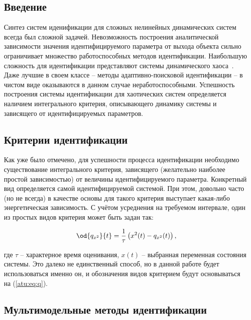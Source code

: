 \documentclass[a4paper,paratype,12pt,fouriernc]{cmonogra}
\title{\bookname}
\author{Коллективный автор}
\begin{document}
\tableofcontents



\subsection*{Введение}

Синтез систем иденификации для сложных нелинейных динамических систем
всегда был сложной задачей. Невозможность построения
аналитической зависимости значения идентифицируемого параметра
от выхода объекта сильно ограничивает множество работоспособных
методов идентификации. Наибольшую сложность для идентификации
представляют системы динамического хаоса~\cite{moon_chaotic_vibr,anisch_nonlin_eff,sprott_212}.
Даже лучшие в своем классе -- методы адаптивно-поисковой идентификации -- %
в чистом виде оказываются в данном случае неработоспособными.
Успешность построения системы идентификации для хаотических
систем определяется наличием интегрального критерия,
описывающего динамику системы и зависящего от идентифицируемых параметров.


\subsection*{Критерии идентификации}

Как уже было отмечено, для успешности процесса идентификации необходимо
существование интегрального критерия, зависящего (желательно наиболее простой зависимостью)
от величины идентифицируемого параметра. Конкретный вид определяется самой идентифицируемой
системой. При этом, довольно часто (но не всегда) в качестве основы для такого критерия выступает
какая-либо энергетическая зависимость. С учётом усреднения на требуемом интервале,
один из простых видов критерия может быть задан так:

\begin{equation}
\od{q_{x^2}}{t}
=
\frac{1}{\tau} \left( x^2(t) - q_{x^2}(t) \right)
,
\label{atu:eq:q}
\end{equation}

\noindent
где $\tau$ -- характерное время оценивания, $x(t)$ -- выбранная переменная состояния системы.
Это далеко не единственный способ, но в данной работе будет использоваться именно он,
и обозначения видов критерием будут основываться на (\ref{atu:eq:q}).

\subsection*{Мультимодельные методы идентификации}
\end{document}
